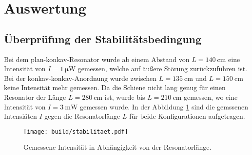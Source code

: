 \section{Auswertung}
\label{sec:Auswertung}
\subsection{Überprüfung der Stabilitätsbedingung}
\label{subsec:stabilitaet}
Bei dem plan-konkav-Resonator wurde ab einem Abstand von $L = \qty{140}{\centi\metre}$ eine Intensität von  $I = \qty{1}{\micro\watt}$ gemessen, welche auf 
äußere Störung zurückzuführen ist.
Bei der konkav-konkav-Anordnung wurde zwischen $L = \qty{135}{\centi\metre}$ und $L = \qty{150}{\centi\metre}$ keine Intensität mehr gemessen. Da die Schiene
nicht lang genug für einen Resonator der Länge $L = \qty{280}{\centi\metre}$ ist, wurde bis $L = \qty{210}{\centi\metre}$ gemessen, wo eine 
Intensität von $I = \qty{3}{\milli\watt}$ gemessen wurde.
In der Abbildung \ref{fig:stabilitaet} sind die gemssenen Intensiäten $I$ gegen die Resonatorlänge $L$ für beide Konfigurationen aufgetragen.
\begin{figure}
    \centering
    \texttt{[image: build/stabilitaet.pdf]}
    \caption{Gemessene Intensität in Abhängigkeit von der Resonatorlänge.}
    \label{fig:stabilitaet}
\end{figure}
\FloatBarrier
